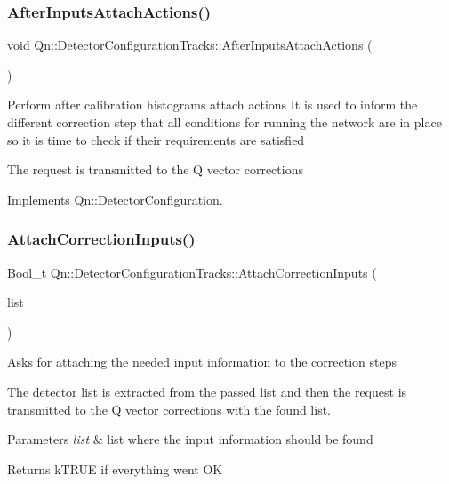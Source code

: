 \subsubsection{\texorpdfstring{After\+Inputs\+Attach\+Actions()}{AfterInputsAttachActions()}}
{\footnotesize\ttfamily void Qn\+::\+Detector\+Configuration\+Tracks\+::\+After\+Inputs\+Attach\+Actions (\begin{DoxyParamCaption}{ }\end{DoxyParamCaption})\hspace{0.3cm}{\ttfamily [virtual]}}

Perform after calibration histograms attach actions It is used to inform the different correction step that all conditions for running the network are in place so it is time to check if their requirements are satisfied

The request is transmitted to the Q vector corrections 

Implements \mbox{\hyperlink{classQn_1_1DetectorConfiguration_ab6766905dffe5811aefa59dd1e1117d8}{Qn\+::\+Detector\+Configuration}}.

\mbox{\label{classQn_1_1DetectorConfigurationTracks_afd9a049e63b16797cd03e6b54d8e209e}} 
\subsubsection{\texorpdfstring{Attach\+Correction\+Inputs()}{AttachCorrectionInputs()}}
{\footnotesize\ttfamily Bool\+\_\+t Qn\+::\+Detector\+Configuration\+Tracks\+::\+Attach\+Correction\+Inputs (\begin{DoxyParamCaption}\item[{T\+List $\ast$}]{list }\end{DoxyParamCaption})\hspace{0.3cm}{\ttfamily [virtual]}}

Asks for attaching the needed input information to the correction steps

The detector list is extracted from the passed list and then the request is transmitted to the Q vector corrections with the found list. 
\begin{DoxyParams}{Parameters}
{\em list} & list where the input information should be found \\
\hline
\end{DoxyParams}
\begin{DoxyReturn}{Returns}
k\+T\+R\+UE if everything went OK 
\end{DoxyReturn}


